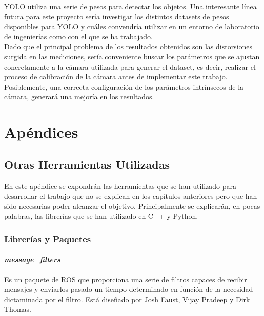 YOLO utiliza una serie de pesos para detectar los objetos. Una interesante línea futura para este proyecto sería investigar los distintos datasets de pesos disponibles para YOLO y cuáles convendría utilizar en un entorno de laboratorio de ingenierías como con el que se ha trabajado.\\

Dado que el principal problema de los resultados obtenidos son las distorsiones surgida en las mediciones, sería conveniente buscar los parámetros que se ajustan concretamente a la cámara utilizada para generar el dataset, es decir, realizar el proceso de calibración de la cámara antes de implementar este trabajo. Posiblemente, una correcta configuración de los parámetros intrínsecos de la cámara, generará una mejoría en los resultados.\\


\part{Apéndices}

\appendix

\chapter{Otras Herramientas Utilizadas}

En este apéndice se expondrán las herramientas que se han utilizado para desarrollar el trabajo que no se explican en los capítulos anteriores pero que han sido necesarias poder alcanzar el objetivo. Principalmente se explicarán, en pocas palabras, las librerías que se han utilizado en C++ y Python.\\

\section{Librerías y Paquetes}

\subsection{\textit{message\_filters}}

Es un paquete de ROS que proporciona una serie de filtros capaces de recibir mensajes y enviarlos pasado un tiempo determinado en función de la necesidad dictaminada por el filtro. Está diseñado por Josh Faust, Vijay Pradeep y Dirk Thomas. \cite{message_filters}\\

